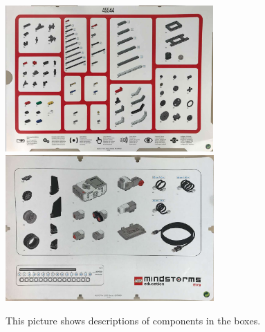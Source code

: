 \documentclass[11pt]{article}
\begin{document}
 \begin{figure}[htbp]
\begin{center}
 \includegraphics[angle=0, height=2.2in]{figures/kit1.jpg}
  \includegraphics[angle=0, height=2.2in]{figures/kit2.jpg}
\end{center}
 \caption{This picture shows descriptions of components in the boxes.}
   \label{fig:kit1}
\end{figure}



\end{document}
